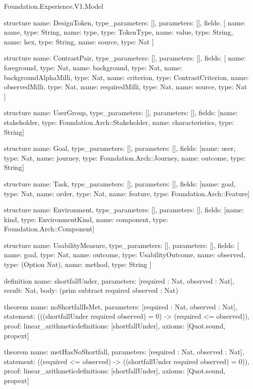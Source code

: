 \begin{lexlean}{Foundation.Experience.V1.Model}
\begin{semanticmodule}
structure{
  name: DesignToken,
  type_parameters: [],
  parameters: [],
  fields: [
    {name: name, type: String},
    {name: type, type: TokenType},
    {name: value, type: String},
    {name: hex, type: String},
    {name: source, type: Nat}
  ]
}

structure{
  name: ContrastPair,
  type_parameters: [],
  parameters: [],
  fields: [
    {name: foreground, type: Nat},
    {name: background, type: Nat},
    {name: backgroundAlphaMilli, type: Nat},
    {name: criterion, type: ContrastCriterion},
    {name: observedMilli, type: Nat},
    {name: requiredMilli, type: Nat},
    {name: source, type: Nat}
  ]
}

structure{
  name: UserGroup,
  type_parameters: [],
  parameters: [],
  fields: [{name: stakeholder, type: Foundation.Arch::Stakeholder}, {name: characteristics, type: String}]
}

structure{
  name: Goal,
  type_parameters: [],
  parameters: [],
  fields: [{name: user, type: Nat}, {name: journey, type: Foundation.Arch::Journey}, {name: outcome, type: String}]
}

structure{
  name: Task,
  type_parameters: [],
  parameters: [],
  fields: [{name: goal, type: Nat}, {name: order, type: Nat}, {name: feature, type: Foundation.Arch::Feature}]
}

structure{
  name: Environment,
  type_parameters: [],
  parameters: [],
  fields: [{name: kind, type: EnvironmentKind}, {name: component, type: Foundation.Arch::Component}]
}

structure{
  name: UsabilityMeasure,
  type_parameters: [],
  parameters: [],
  fields: [
    {name: goal, type: Nat},
    {name: outcome, type: UsabilityOutcome},
    {name: observed, type: (Option Nat)},
    {name: method, type: String}
  ]
}

definition{
  name: shortfallUnder,
  parameters: [required : Nat, observed : Nat],
  result: Nat,
  body: (prim subtract required observed : Nat)
}

theorem{
  name: noShortfallIsMet,
  parameters: [required : Nat, observed : Nat],
  statement: (((shortfallUnder required observed) = 0) -> (required <= observed)),
  proof: linear_arithmetic{definitions: [shortfallUnder]},
  axioms: [Quot.sound, propext]
}

theorem{
  name: metHasNoShortfall,
  parameters: [required : Nat, observed : Nat],
  statement: ((required <= observed) -> ((shortfallUnder required observed) = 0)),
  proof: linear_arithmetic{definitions: [shortfallUnder]},
  axioms: [Quot.sound, propext]
}


\end{semanticmodule}
\end{lexlean}
